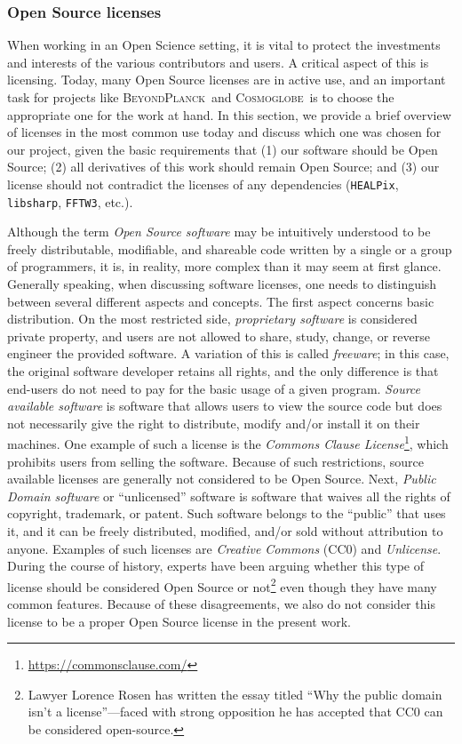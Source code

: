 \documentclass[twocolumn]{aa}
\newcommand{\BP}{\textsc{BeyondPlanck}}
\newcommand{\cosmoglobe}{\textsc{Cosmoglobe}}
\begin{document}
\subsubsection{Open Source licenses}

When working in an Open Science setting, it is vital to protect the investments and interests of the various contributors and users. A critical aspect of this is licensing. Today, many Open Source licenses are in active use, and an important task for projects like \BP\ and \cosmoglobe\ is to choose the appropriate one for the work at hand. In this section, we provide a brief overview of licenses in the most common use today and discuss which one was chosen for our project, given the basic requirements that (1) our software should be Open Source; (2) all derivatives of this work should remain Open Source; and (3) our license should not contradict the licenses of any dependencies (\texttt{HEALPix}, \texttt{libsharp}, \texttt{FFTW3}, etc.).

Although the term \textit{Open Source software} may be intuitively understood to be freely distributable, modifiable, and shareable code written by a single or a group of programmers, it is, in reality, more complex than it may seem at first glance. Generally speaking, when discussing software licenses, one needs to distinguish between several different aspects and concepts. The first aspect concerns basic distribution. On the most restricted side, \emph{proprietary software} is considered private property, and users are not allowed to share, study, change, or reverse engineer the provided software. A variation of this is called \emph{freeware}; in this case, the original software developer retains all rights, and the only difference is that end-users do not need to pay for the basic usage of a given program. \textit{Source available software} is software that allows users to view the source code but does not necessarily give the right to distribute, modify and/or install it on their machines. One example of such a license is the \textit{Commons Clause License}\footnote{\url{https://commonsclause.com/}}, which prohibits users from selling the software. Because of such restrictions, source available licenses are generally not considered to be Open Source. Next, \textit{Public Domain software} or ``unlicensed'' software is software that waives all the rights of copyright, trademark, or patent. Such software belongs to the ``public'' that uses it, and it can be freely distributed, modified, and/or sold without attribution to anyone. Examples of such licenses are \textit{Creative Commons} (CC0) and \textit{Unlicense}. During the course of history, experts have been arguing whether this type of license should be considered Open Source or not\footnote{Lawyer Lorence Rosen has written the essay titled ``Why the public domain isn't a license''—faced with strong opposition he has accepted that CC0 can be considered open-source.} even though they have many common features. Because of these disagreements, we also do not consider this license to be a proper Open Source license in the present work.
\end{document}

